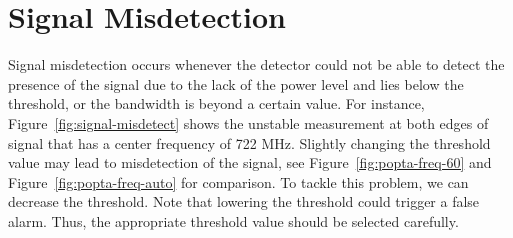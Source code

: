 \section{Signal Misdetection}

Signal misdetection occurs whenever the detector could not be able to detect the presence of the signal due to the lack of the power level and lies below the threshold, or the bandwidth is beyond a certain value. For instance, Figure~\ref{fig:signal-misdetect} shows the unstable measurement at both edges of signal that has a center frequency of 722 MHz. Slightly changing the threshold value may lead to misdetection of the signal, see Figure~\ref{fig:popta-freq-60} and Figure~\ref{fig:popta-freq-auto} for comparison. To tackle this problem, we can decrease the threshold. Note that lowering the threshold could trigger a false alarm. Thus, the appropriate threshold value should be selected carefully. 

